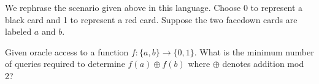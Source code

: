         We rephrase the scenario given above in this language.  Choose 0 to represent a black card and 1 to
        represent a red card. Suppose the two facedown cards are labeled $a$ and $b$.   
       
        \begin{example} 
            Given oracle access to a function $f: \{a, b\} \rightarrow \{0, 1\}$. What is the minimum number of
            queries required to determine $f(a) \oplus f(b)$ where $\oplus$ denotes addition mod 2?
        \end{example}

        




        




        
